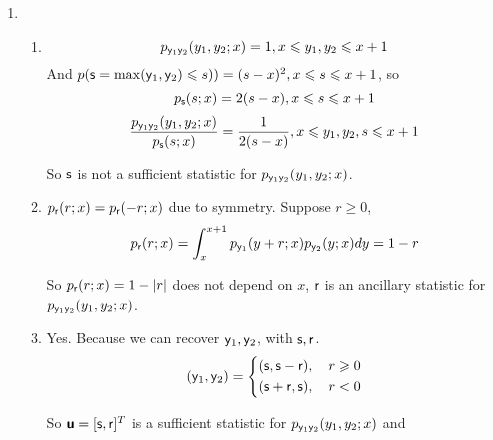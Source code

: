 \documentclass[a4paper]{article}
\begin{document}
\vspace{2em}


\begin{enumerate}
  \setlength{\itemsep}{3\parskip}

  \item \begin{enumerate}
    \item \begin{equation}
      p_{\mathsf{y}_1\mathsf{y}_2}(y_1,y_2;x) = 1, x\leqslant y_1,y_2 \leqslant x+1
    \end{equation} 
    And $p(\mathsf{s}=\max(\mathsf{y}_1,\mathsf{y}_2) \leqslant s)) = (s-x)^2, x \leqslant s \leqslant x+1$, so \begin{equation}
      p_{\mathsf{s}}(s;x) = 2(s-x), x \leqslant s \leqslant x+1
    \end{equation}
    \begin{equation}
      \begin{aligned}
        \frac{p_{\mathsf{y}_1\mathsf{y}_2}(y_1,y_2;x)}{p_{\mathsf{s}}(s;x)} = \frac{1}{2(s-x)}, x \leqslant y_1,y_2,s \leqslant x+1
      \end{aligned}
    \end{equation}

    So $\mathsf{s}$ is not a sufficient statistic for $p_{\mathsf{y}_1\mathsf{y}_2}(y_1,y_2;x)$.

  \item $p_{\mathsf{r}}(r;x) = p_{\mathsf{r}}(-r;x) $ due to symmetry. Suppose $r\geqslant 0$, 
   \begin{equation}
    p_{\mathsf{r}} (r;x) = \int_{x}^{x+1} p_{\mathsf{y}_1}(y+r;x) p_{\mathsf{y}_2}(y;x) dy = 1-r
  \end{equation}

  So $p_{\mathsf{r}} (r;x) = 1-|r|$ does not depend on $x$, $\mathsf{r}$ is an ancillary statistic for $p_{\mathsf{y}_1\mathsf{y}_2}(y_1,y_2;x)$.

  \item Yes. Because we can recover $\mathsf{y}_1,\mathsf{y}_2$, with $\mathsf{s},\mathsf{r}$.
  \begin{equation}
    (\mathsf{y}_1,\mathsf{y}_2) = \left\{\begin{aligned}
      (\mathsf{s},\mathsf{s}-\mathsf{r}), \quad r \geqslant 0 \\
      (\mathsf{s}+\mathsf{r},\mathsf{s}), \quad r <0
    \end{aligned}\right.
  \end{equation}

  So $\boldsymbol{\mathsf{u}} = [\mathsf{s},\mathsf{r}]^T $ is a sufficient statistic for $p_{\mathsf{y}_1\mathsf{y}_2}(y_1,y_2;x)$ and 
  \end{enumerate}


\end{enumerate}
\end{document}
